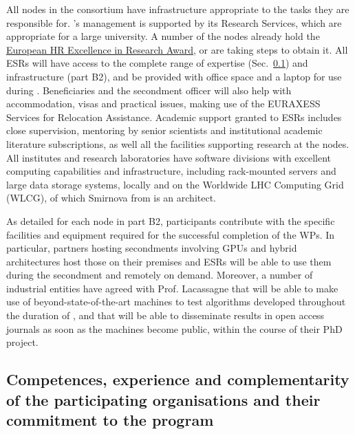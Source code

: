 %
All nodes in the consortium have infrastructure appropriate to the tasks
they are responsible for. \lundentity's management is supported by its Research Services, 
which are appropriate for a large university. 
A number of the nodes already hold the \href{https://euraxess.ec.europa.eu/jobs/charter/declaration-endorsement}{European HR Excellence in Research Award}, or are taking steps to obtain it.
All ESRs will have access to the complete range of \acronym
expertise (Sec.~\ref{ss:competence_44}) and infrastructure (part B2),
and be provided with office space and a laptop for use during \acronym. 
Beneficiaries and the secondment officer will also help with accommodation,
visas and practical issues, making use of the EURAXESS Services for Relocation Assistance. 
Academic support granted to ESRs includes close supervision, mentoring by senior scientists and 
institutional academic literature subscriptions, as well all the facilities supporting research at the nodes. 
All institutes and research laboratories have software divisions with excellent computing
capabilities and infrastructure, including rack-mounted
servers and large data storage systems, locally and on the Worldwide LHC Computing Grid (WLCG),
of which Smirnova from \lundentity is an architect.

As detailed for each node in part B2, \acronym participants
contribute with the specific facilities and equipment required for the successful completion of the WPs.
In particular, partners hosting secondments involving GPUs and hybrid architectures host those on their premises
and ESRs will be able to use them during the secondment and remotely on demand. 
Moreover, a number of industrial entities have agreed with Prof. Lacassagne that \ESRg
will be able to make use of beyond-state-of-the-art machines to test algorithms developed
throughout the duration of \acronym, and that \ESRg will
be able to disseminate results in open access journals as soon as
the machines become public, within the course of their PhD project. 

\subsection{Competences, experience and complementarity of the participating organisations and their commitment to the program}
\label{ss:competence_44}

